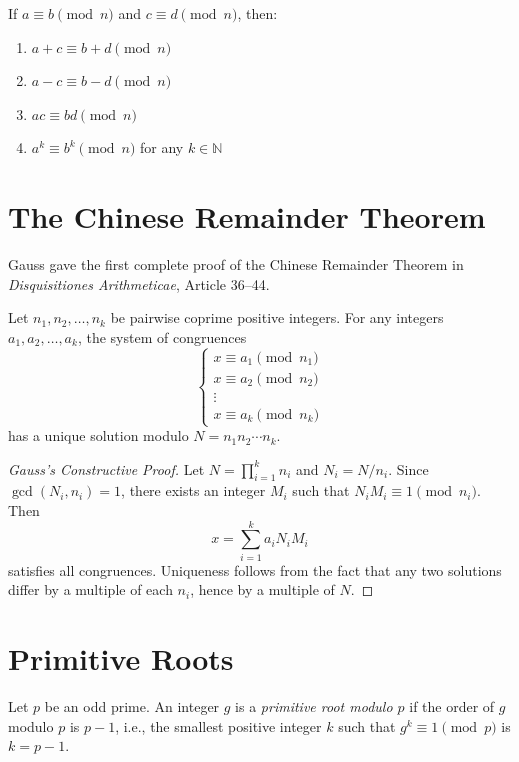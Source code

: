 \begin{theorem}
If $a \equiv b \pmod{n}$ and $c \equiv d \pmod{n}$, then:
\begin{enumerate}
    \item $a + c \equiv b + d \pmod{n}$
    \item $a - c \equiv b - d \pmod{n}$
    \item $ac \equiv bd \pmod{n}$
    \item $a^k \equiv b^k \pmod{n}$ for any $k \in \mathbb{N}$
\end{enumerate}
\end{theorem}

\section{The Chinese Remainder Theorem}

Gauss gave the first complete proof of the Chinese Remainder Theorem in \textit{Disquisitiones Arithmeticae}, Article 36--44.

\begin{theorem}
Let $n_1, n_2, \ldots, n_k$ be pairwise coprime  positive integers. For any integers $a_1, a_2, \ldots, a_k$, the system of congruences
\[
\begin{cases}
x \equiv a_1 \pmod{n_1} \\
x \equiv a_2 \pmod{n_2} \\
\vdots \\
x \equiv a_k \pmod{n_k}
\end{cases}
\]
has a unique solution modulo $N = n_1 n_2 \cdots n_k$.
\end{theorem}

\begin{proof}[Gauss's Constructive Proof]
Let $N = \prod_{i=1}^k n_i$ and $N_i = N/n_i$. Since $\gcd(N_i, n_i) = 1$, there exists an integer $M_i$ such that $N_i M_i \equiv 1 \pmod{n_i}$. Then
\[
x = \sum_{i=1}^k a_i N_i M_i
\]
satisfies all congruences. Uniqueness follows from the fact that any two solutions differ by a multiple of each $n_i$, hence by a multiple of $N$.
\end{proof}

\section{Primitive Roots}

\begin{definition}
Let $p$ be an odd prime. An integer $g$ is a \textit{primitive root modulo $p$}  if the order of $g$ modulo $p$ is $p-1$, i.e., the smallest positive integer $k$ such that $g^k \equiv 1 \pmod{p}$ is $k = p-1$.
\end{definition}


